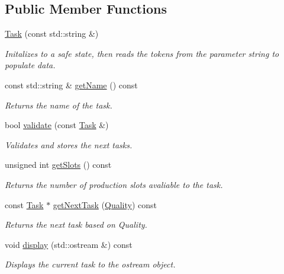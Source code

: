 \subsection*{Public Member Functions}
\begin{DoxyCompactItemize}
\item 
\mbox{\hyperlink{class_task_ace3ff25451f6d46f6cc0f2d7ed4b16ef}{Task}} (const std\+::string \&)
\begin{DoxyCompactList}\small\item\em Initalizes to a safe state, then reads the tokens from the parameter string to populate data. \end{DoxyCompactList}\item 
const std\+::string \& \mbox{\hyperlink{class_task_a0c1ae0dd618c9b8ae35591040d3776f3}{get\+Name}} () const
\begin{DoxyCompactList}\small\item\em Returns the name of the task. \end{DoxyCompactList}\item 
bool \mbox{\hyperlink{class_task_a974eb3143ac070fd67495f3c4a108a96}{validate}} (const \mbox{\hyperlink{class_task}{Task}} \&)
\begin{DoxyCompactList}\small\item\em Validates and stores the next tasks. \end{DoxyCompactList}\item 
unsigned int \mbox{\hyperlink{class_task_a67589413dbb0d5ffa3b2f08c6fa461ea}{get\+Slots}} () const
\begin{DoxyCompactList}\small\item\em Returns the number of production slots avaliable to the task. \end{DoxyCompactList}\item 
const \mbox{\hyperlink{class_task}{Task}} $\ast$ \mbox{\hyperlink{class_task_acf6851078d506896872fa7cc6476e5bf}{get\+Next\+Task}} (\mbox{\hyperlink{class_task_a6b8b1fc5858cbd77055e79d6381282fb}{Quality}}) const
\begin{DoxyCompactList}\small\item\em Returns the next task based on Quality. \end{DoxyCompactList}\item 
void \mbox{\hyperlink{class_task_aff00aecd7c14bd02434b76ad10a656a2}{display}} (std\+::ostream \&) const
\begin{DoxyCompactList}\small\item\em Displays the current task to the ostream object. \end{DoxyCompactList}\end{DoxyCompactItemize}
